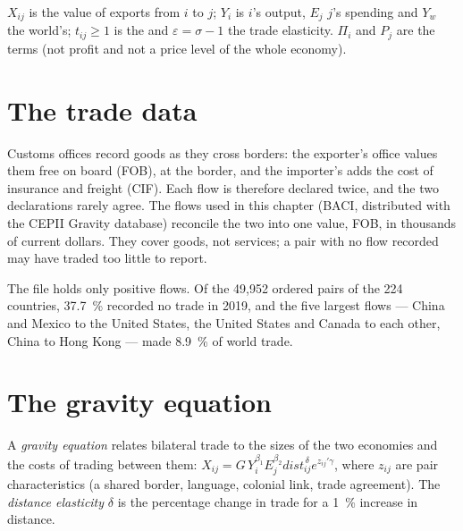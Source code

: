 \begin{notation}\label{not:b3:gravity:symbols}
$X_{ij}$ is the value of exports from $i$ to $j$; $Y_i$ is $i$'s output, $E_j$ $j$'s
spending and $Y_w$ the world's; $t_{ij} \ge 1$ is the  and $\varepsilon = \sigma
- 1$ the trade elasticity. $\Pi_i$ and $P_j$ are the  terms
(not profit and not a price level of the whole economy).
\end{notation}

\section{The trade data}\label{sec:b3:gravity:data}

\begin{measure}
Customs offices record goods as they cross borders: the exporter's office values
them free on board (FOB), at the border, and the importer's adds the cost of
insurance and freight (CIF). Each flow is therefore declared twice, and the two
declarations rarely agree. The flows used in this chapter (BACI, distributed with
the CEPII Gravity database) reconcile the two into one value, FOB, in thousands
of current dollars. They cover goods, not services; a pair with no flow recorded
may have traded too little to report.
\end{measure}

\label{lst:b3:gravity:load}

\label{out:b3:gravity:load}

The file holds only positive flows. Of the 49{,}952 ordered pairs of the 224
countries, 37.7~\% recorded no trade in 2019, and the five largest flows --- China
and Mexico to the United States, the United States and Canada to each other, China
to Hong Kong --- made 8.9~\% of world trade. %

\section{The gravity equation}\label{sec:b3:gravity:equation}

\begin{definition}\label{def:b3:gravity:gravity}
A \emph{gravity equation} relates bilateral trade to the sizes of the two economies
and the costs of trading between them:
$X_{ij} = G\, Y_i^{\beta_1} E_j^{\beta_2} \mathit{dist}_{ij}^{\,\delta} e^{z_{ij}'\gamma}$, where $z_{ij}$ are pair
characteristics (a shared border, language, colonial link, trade agreement). The
\emph{distance elasticity} $\delta$ is the percentage change in trade for a 1~\%
increase in distance.
\end{definition}

